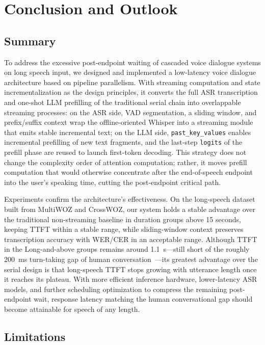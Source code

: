 \documentclass[pdflatex,iicol,Numbered,sn-basic]{sn-jnl}%
\begin{document}
\section{Conclusion and Outlook}\label{sec:conclusion}

\subsection{Summary}

To address the excessive post-endpoint waiting of cascaded voice dialogue systems on long speech input, we designed and implemented a low-latency voice dialogue architecture based on pipeline parallelism. With streaming computation and state incrementalization as the design principles, it converts the full ASR transcription and one-shot LLM prefilling of the traditional serial chain into overlappable streaming processes: on the ASR side, VAD segmentation, a sliding window, and prefix/suffix context wrap the offline-oriented Whisper into a streaming module that emits stable incremental text; on the LLM side, \texttt{past\_key\_values} enables incremental prefilling of new text fragments, and the last-step \texttt{logits} of the prefill phase are reused to launch first-token decoding. This strategy does not change the complexity order of attention computation; rather, it moves prefill computation that would otherwise concentrate after the end-of-speech endpoint into the user's speaking time, cutting the post-endpoint critical path.

Experiments confirm the architecture's effectiveness. On the long-speech dataset built from MultiWOZ and CrossWOZ, our system holds a stable advantage over the traditional non-streaming baseline in duration groups above 15 seconds, keeping TTFT within a stable range, while sliding-window context preserves transcription accuracy with WER/CER in an acceptable range. Although TTFT in the Long-and-above groups remains around 1.1~s---still short of the roughly 200~ms turn-taking gap of human conversation~\cite{ref21}---its greatest advantage over the serial design is that long-speech TTFT stops growing with utterance length once it reaches its plateau. With more efficient inference hardware, lower-latency ASR models, and further scheduling optimization to compress the remaining post-endpoint wait, response latency matching the human conversational gap should become attainable for speech of any length.

\subsection{Limitations}
\end{document}
